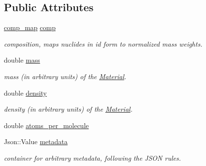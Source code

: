 \subsection*{Public Attributes}
\begin{DoxyCompactItemize}
\item 
\hyperlink{namespacepyne_a86738cecccf4ce3f4ecc2ff6f45ce1a2}{comp\+\_\+map} \hyperlink{classpyne_1_1_material_a2b0e850a66f2b8cb2b106307a00a18ed}{comp}\hypertarget{classpyne_1_1_material_a2b0e850a66f2b8cb2b106307a00a18ed}{}\label{classpyne_1_1_material_a2b0e850a66f2b8cb2b106307a00a18ed}

\begin{DoxyCompactList}\small\item\em composition, maps nuclides in id form to normalized mass weights. \end{DoxyCompactList}\item 
double \hyperlink{classpyne_1_1_material_a729ebba0be2879f26f1fcf3b100d3b5d}{mass}\hypertarget{classpyne_1_1_material_a729ebba0be2879f26f1fcf3b100d3b5d}{}\label{classpyne_1_1_material_a729ebba0be2879f26f1fcf3b100d3b5d}

\begin{DoxyCompactList}\small\item\em mass (in arbitrary units) of the \hyperlink{classpyne_1_1_material}{Material}. \end{DoxyCompactList}\item 
double \hyperlink{classpyne_1_1_material_a916eb7ed0143844a505c454d47755ab0}{density}\hypertarget{classpyne_1_1_material_a916eb7ed0143844a505c454d47755ab0}{}\label{classpyne_1_1_material_a916eb7ed0143844a505c454d47755ab0}

\begin{DoxyCompactList}\small\item\em density (in arbitrary units) of the \hyperlink{classpyne_1_1_material}{Material}. \end{DoxyCompactList}\item 
double \hyperlink{classpyne_1_1_material_a7ddff1aaebc94bcda22d3422c093a756}{atoms\+\_\+per\+\_\+molecule}
\item 
Json\+::\+Value \hyperlink{classpyne_1_1_material_aee299ae39a32a7ff98e14c2aa3eabe32}{metadata}\hypertarget{classpyne_1_1_material_aee299ae39a32a7ff98e14c2aa3eabe32}{}\label{classpyne_1_1_material_aee299ae39a32a7ff98e14c2aa3eabe32}

\begin{DoxyCompactList}\small\item\em container for arbitrary metadata, following the J\+S\+ON rules. \end{DoxyCompactList}\end{DoxyCompactItemize}
